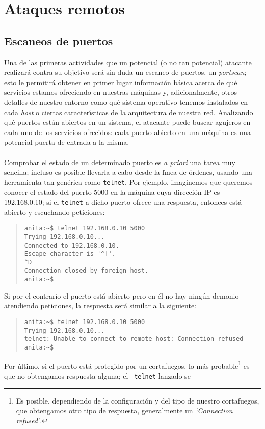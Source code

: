 \chapter{Ataques remotos}
\section{Escaneos de puertos}
Una de las primeras actividades que un potencial (o no tan potencial) atacante 
realizar\'a contra su objetivo ser\'a sin duda un escaneo de puertos, un {\it 
portscan}; esto le permitir\'a obtener en primer lugar informaci\'on b\'asica 
acerca de qu\'e servicios estamos ofreciendo en nuestras m\'aquinas y, 
adicionalmente, otros detalles de nuestro entorno como qu\'e sistema operativo 
tenemos instalados en cada {\it host} o ciertas caracter\'{\i}sticas de la
arquitectura de nuestra red. Analizando qu\'e puertos est\'an abiertos en un
sistema, el atacante puede buscar agujeros en cada uno de los servicios 
ofrecidos: cada puerto abierto en una m\'aquina es una potencial puerta de 
entrada a la misma.\\
\\Comprobar el estado de un determinado puerto es {\it a priori} una tarea muy
sencilla; incluso es posible llevarla a cabo desde la l\'{\i}nea de \'ordenes,
usando una herramienta tan gen\'erica como {\tt telnet}. Por ejemplo, imaginemos
que queremos conocer el estado del puerto 5000 en la m\'aquina cuya direcci\'on
IP es 192.168.0.10; si el {\tt telnet} a dicho puerto ofrece una respuesta, 
entonces est\'a abierto y escuchando peticiones:
\begin{quote}
\begin{verbatim}
anita:~$ telnet 192.168.0.10 5000 
Trying 192.168.0.10...
Connected to 192.168.0.10.
Escape character is '^]'.
^D
Connection closed by foreign host.
anita:~$ 
\end{verbatim}
\end{quote}
Si por el contrario el puerto est\'a abierto pero en \'el no hay ning\'un 
demonio atendiendo peticiones, la respuesta ser\'a similar a la siguiente:
\begin{quote}
\begin{verbatim}
anita:~$ telnet 192.168.0.10 5000
Trying 192.168.0.10...
telnet: Unable to connect to remote host: Connection refused
anita:~$ 
\end{verbatim}
\end{quote}
Por \'ultimo, si el puerto est\'a protegido por un cortafuegos, lo m\'as 
probable\footnote{Es posible, dependiendo de la configuraci\'on y del tipo de 
nuestro cortafuegos, que obtengamos otro tipo de respuesta, generalmente un
{\it `Connection refused'}.} es que no obtengamos respuesta alguna; el {\tt 
telnet} lanzado se 
